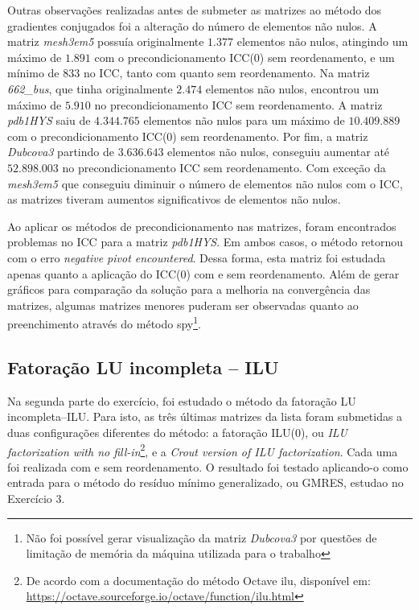 \documentclass{article}
\begin{document}
Outras observações realizadas antes de submeter as matrizes ao método dos gradientes conjugados foi a alteração do número de elementos não nulos. A matriz \textit{mesh3em5} possuía originalmente $1.377$ elementos não nulos, atingindo um máximo de $1.891$ com o precondicionamento ICC(0) sem reordenamento, e um mínimo de 833 no ICC, tanto com quanto sem reordenamento. Na matriz \textit{662\_bus}, que tinha originalmente $2.474$ elementos não nulos, encontrou um máximo de $5.910$ no precondicionamento ICC sem reordenamento. A matriz \textit{pdb1HYS} saiu de $4.344.765$ elementos não nulos para um máximo de $10.409.889$ com o precondicionamento ICC(0) sem reordenamento. Por fim, a matriz \textit{Dubcova3} partindo de $3.636.643$ elementos não nulos, conseguiu aumentar até $52.898.003$ no precondicionamento ICC sem reordenamento. Com exceção da \textit{mesh3em5} que conseguiu diminuir o número de elementos não nulos com o ICC, as matrizes tiveram aumentos significativos de elementos não nulos.

Ao aplicar os métodos de precondicionamento nas matrizes, foram encontrados problemas no ICC para a matriz \textit{pdb1HYS}. Em ambos casos, o método retornou com o erro \textit{negative pivot encountered}. Dessa forma, esta matriz foi estudada apenas quanto a aplicação do ICC(0) com e sem reordenamento. Além de gerar gráficos para comparação da solução para a melhoria na convergência das matrizes, algumas matrizes menores puderam ser observadas quanto ao preenchimento através do método spy\footnote{Não foi possível gerar visualização da matriz \textit{Dubcova3} por questões de limitação de memória da máquina utilizada para o trabalho}.

\subsection{Fatoração LU incompleta -- ILU}
Na segunda parte do exercício, foi estudado o método da fatoração LU incompleta--ILU. Para isto, as três últimas matrizes da lista foram submetidas a duas configurações diferentes do método: a fatoração ILU(0), ou \textit{ILU factorization with no fill-in}\footnote{De acordo com a documentação do método Octave ilu, disponível em: \href{https://octave.sourceforge.io/octave/function/ilu.html}{https://octave.sourceforge.io/octave/function/ilu.html}}, e a \textit{Crout version of ILU factorization}. Cada uma foi realizada com e sem reordenamento. O resultado foi testado aplicando-o como entrada para o método do resíduo mínimo generalizado, ou GMRES, estudao no Exercício 3.
\end{document}
